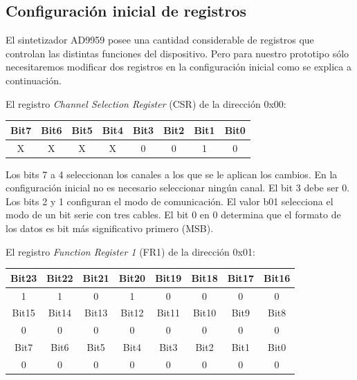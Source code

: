 \documentclass{article}
\newenvironment{standalone}{\begin{preview}}{\end{preview}}
\begin{document}
\begin{standalone}

  \subsection{Configuración inicial de registros}

  El sintetizador AD9959 posee una cantidad considerable de registros que controlan las distintas funciones del dispositivo.
  Pero para nuestro prototipo sólo necesitaremos modificar dos registros en la configuración inicial como se explica a continuación.

  El registro \textit{Channel Selection Register} (CSR) de la dirección 0x00:
  \begin{table}[!htbp]
    \centering
    \begin{tabular}{|c|c|c|c|c|c|c|c|}
    \hline
    \rowcolor[HTML]{EFEFEF}
    Bit7 & Bit6 & Bit5 & Bit4 & Bit3 & Bit2 & Bit1 & Bit0 \\ \hline
    X    & X    & X    & X    & 0    & 0    & 1    & 0    \\ \hline
    \end{tabular}
  \end{table}

  Los bits 7 a 4 seleccionan los canales a los que se le aplican los cambios.
  En la configuración inicial no es necesario seleccionar ningún canal.
  El bit 3 debe ser 0.
  Los bits 2 y 1 configuran el modo de comunicación.
  El valor b01 selecciona el modo de un bit serie con tres cables.
  El bit 0 en 0 determina que el formato de los datos es bit más significativo primero (MSB).

  El registro \textit{Function Register 1} (FR1) de la dirección 0x01:
  \begin{table}[!htbp]
    \centering
    \begin{tabular}{|c|c|c|c|c|c|c|c|}
    \hline
    \rowcolor[HTML]{EFEFEF}
    Bit23 & Bit22 & Bit21 & Bit20 & Bit19 & Bit18 & Bit17 & Bit16 \\ \hline
    1     & 1     & 0     & 1     & 0     & 0     & 0     & 0     \\ \hline
    \rowcolor[HTML]{EFEFEF}
    Bit15 & Bit14 & Bit13 & Bit12 & Bit11 & Bit10 & Bit9  & Bit8  \\ \hline
    0     & 0     & 0     & 0     & 0     & 0     & 0     & 0     \\ \hline
    \rowcolor[HTML]{EFEFEF}
    Bit7  & Bit6  & Bit5  & Bit4  & Bit3  & Bit2  & Bit1  & Bit0  \\ \hline
    0     & 0     & 0     & 0     & 0     & 0     & 0     & 0     \\ \hline
    \end{tabular}
  \end{table}


\end{standalone}
\end{document}
